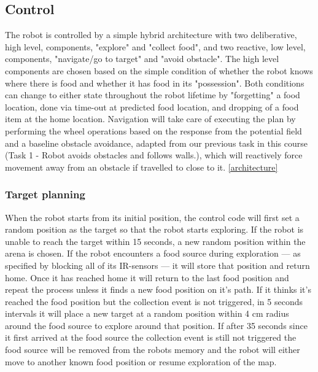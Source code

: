\documentclass[paper=a4, fontsize=12pt]{scrartcl}	%
\numberwithin{equation}{section}		%
\numberwithin{figure}{section}			%
\numberwithin{table}{section}				%
\begin{document}
\subsection{Control}
The robot is controlled by a simple hybrid architecture with two deliberative, high level, components, "explore" and "collect food", and two reactive, low level, components, "navigate/go to target" and "avoid obstacle". The high level components are chosen based on the simple condition of whether the robot knows where there is food and whether it has food in its "possession". Both conditions can change to either state throughout the robot lifetime by "forgetting" a food location, done via time-out at predicted food location, and dropping of a food item at the home location. Navigation will take care of executing the plan by performing the wheel operations based on the response from the potential field and a baseline obstacle avoidance, adapted from our previous task in this course (Task 1 - Robot avoids obstacles and follows walls.), which will reactively force movement away from an obstacle if travelled to close to it. \ref{architecture}

\subsubsection{Target planning}
When the robot starts from its initial position, the control code will first set a random position as the target so that the robot starts exploring. If the robot is unable to reach the target within 15 seconds, a new random position within the arena is chosen. If the robot encounters a food source during exploration --- as specified by blocking all of its IR-sensors --- it will store that position and return home. Once it has reached home it will return to the last food position and repeat the process unless it finds a new food position on it's path. If it thinks it's reached the food position but the collection event is not triggered, in 5 seconds intervals it will place a new target at a random position within 4 cm radius around the food source to explore around that position. If after 35 seconds since it first arrived at the food source the collection event is still not triggered the food source will be removed from the robots memory and the robot will either move to another known food position or resume exploration of the map.
\end{document}
